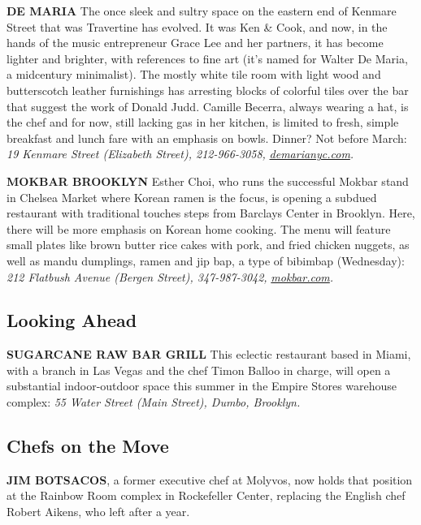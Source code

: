 \textbf{DE MARIA} The once sleek and sultry space on the eastern end of
Kenmare Street that was Travertine has evolved. It was Ken \& Cook, and
now, in the hands of the music entrepreneur Grace Lee and her partners,
it has become lighter and brighter, with references to fine art (it's
named for Walter De Maria, a midcentury minimalist). The mostly white
tile room with light wood and butterscotch leather furnishings has
arresting blocks of colorful tiles over the bar that suggest the work of
Donald Judd. Camille Becerra, always wearing a hat, is the chef and for
now, still lacking gas in her kitchen, is limited to fresh, simple
breakfast and lunch fare with an emphasis on bowls. Dinner? Not before
March: \emph{19 Kenmare Street (Elizabeth Street), 212-966-3058,}
\href{https://www.demarianyc.com/}{\emph{demarianyc.com}}\emph{.}

\textbf{MOKBAR BROOKLYN} Esther Choi, who runs the successful Mokbar
stand in Chelsea Market where Korean ramen is the focus, is opening a
subdued restaurant with traditional touches steps from Barclays Center
in Brooklyn. Here, there will be more emphasis on Korean home cooking.
The menu will feature small plates like brown butter rice cakes with
pork, and fried chicken nuggets, as well as mandu dumplings, ramen and
jip bap, a type of bibimbap (Wednesday): \emph{212 Flatbush Avenue
(Bergen Street), 347-987-3042,}
\href{http://mokbar.com/}{\emph{mokbar.com}}\emph{.}

\hypertarget{looking-ahead}{%
\subsection{Looking Ahead}\label{looking-ahead}}

\textbf{SUGARCANE RAW BAR GRILL} This eclectic restaurant based in
Miami, with a branch in Las Vegas and the chef Timon Balloo in charge,
will open a substantial indoor-outdoor space this summer in the Empire
Stores warehouse complex: \emph{55 Water Street (Main Street), Dumbo,
Brooklyn.}

\hypertarget{chefs-on-the-move}{%
\subsection{Chefs on the Move}\label{chefs-on-the-move}}

\textbf{JIM BOTSACOS}, a former executive chef at Molyvos, now holds
that position at the Rainbow Room complex in Rockefeller Center,
replacing the English chef Robert Aikens, who left after a year.

